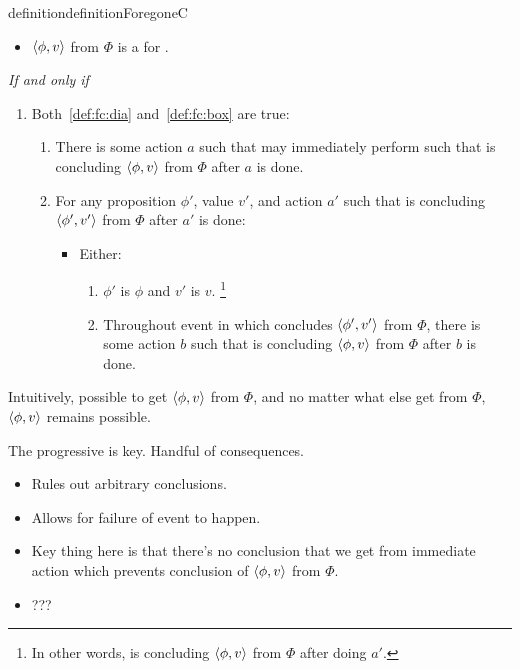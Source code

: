 \begin{note}[\fc{2} definition]
\begin{restatable}[\fc{3}]{definition}{definitionForegoneC}
    \begin{itemize}
    \item
      \(\langle \phi, v \rangle\) from \(\Phi\) is a \emph{} for \vAgent{}.
    \end{itemize}
    \emph{If and only if}
    \begin{enumerate}[label=]
    \item
      Both~\ref{def:fc:dia} and~\ref{def:fc:box} are true:
      \begin{enumerate}[label=\alph*., ref=(\alph*)]
      \item
        \label{def:fc:dia}
        There is some action \(a\) such that \vAgent{} may immediately perform such that \vAgent{} is concluding \(\langle \phi, v \rangle\) from \(\Phi\) after \(a\) is done.
      \item
        \label{def:fc:box}
        For any proposition \(\phi'\), value \(v'\), and action \(a'\) such that \vAgent{} is concluding \(\langle \phi', v' \rangle\) from \(\Phi\) after \(a'\) is done:
        \begin{itemize}
        \item
          Either:
          \begin{enumerate}[label=\arabic*., ref=(\arabic*)]
          \item
            \(\phi'\) is \(\phi\) and \(v'\) is \(v\).%
            \footnote{
              In other words, \vAgent{} is concluding \(\langle \phi, v \rangle\) from \(\Phi\) after doing \(a'\).
            }
          \item
            Throughout event in which \vAgent{} concludes \(\langle \phi', v' \rangle\) from \(\Phi\), there is some action \(b\) such that \vAgent{} is concluding \(\langle \phi, v \rangle\) from \(\Phi\) after \(b\) is done.
          \end{enumerate}
        \end{itemize}
      \end{enumerate}
    \end{enumerate}
    \vspace{-\baselineskip}
  \end{restatable}

  Intuitively, possible to get \(\langle \phi, v \rangle\) from \(\Phi\), and no matter what else get from \(\Phi\), \(\langle \phi, v \rangle\) remains possible.

  The progressive is key.
  Handful of consequences.

  \begin{itemize}
  \item
    Rules out arbitrary conclusions.
  \item
    Allows for failure of event to happen.
  \item
    Key thing here is that there's no conclusion that we get from immediate action which prevents conclusion of \(\langle \phi, v \rangle\) from \(\Phi\).
  \item
    ???
  \end{itemize}
\end{note}



